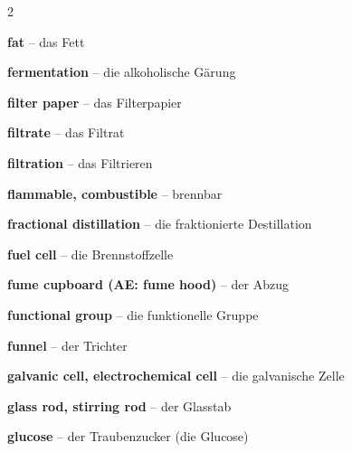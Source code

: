 \begin{multicols}{2}
\par\nopagebreak
\textbf{fat} -- das Fett\dotfill\hyperref[e:240]{\pageref*{e:240}}\par
\textbf{fermentation} -- die alkoholische Gärung\dotfill\hyperref[e:247]{\pageref*{e:247}}\par
\textbf{filter paper} -- das Filterpapier\dotfill\hyperref[e:45]{\pageref*{e:45}}\par
\textbf{filtrate} -- das Filtrat\dotfill\hyperref[e:32]{\pageref*{e:32}}\par
\textbf{filtration} -- das Filtrieren\dotfill\hyperref[e:31]{\pageref*{e:31}}\par
\textbf{flammable, combustible} -- brennbar\dotfill\hyperref[e:28]{\pageref*{e:28}}\par
\textbf{fractional distillation} -- die fraktionierte Destillation\dotfill\hyperref[e:233]{\pageref*{e:233}}\par
\textbf{fuel cell} -- die Brennstoffzelle\dotfill\hyperref[e:203]{\pageref*{e:203}}\par
\textbf{fume cupboard (AE: fume hood)} -- der Abzug\dotfill\hyperref[e:63]{\pageref*{e:63}}\par
\textbf{functional group} -- die funktionelle Gruppe\dotfill\hyperref[e:218]{\pageref*{e:218}}\par
\textbf{funnel} -- der Trichter\dotfill\hyperref[e:44]{\pageref*{e:44}}\par

\par\nopagebreak
\textbf{galvanic cell, electrochemical cell} -- die galvanische Zelle\dotfill\hyperref[e:200]{\pageref*{e:200}}\par
\textbf{glass rod, stirring rod} -- der Glasstab\dotfill\hyperref[e:53]{\pageref*{e:53}}\par
\textbf{glucose} -- der Traubenzucker (die Glucose)\dotfill\hyperref[e:242]{\pageref*{e:242}}\par


\end{multicols}
